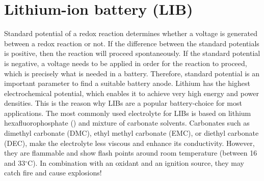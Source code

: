 \section{Lithium-ion battery (LIB)}
Standard potential of a redox reaction determines whether a voltage is generated between a redox reaction or not. If the difference between the standard potentials is positive, then the reaction will proceed spontaneously. If the standard potential is negative, a voltage needs to be applied in order for the reaction to proceed, which is precisely what is needed in a battery. Therefore, standard potential is an important parameter to find a suitable battery anode. Lithium has the highest electrochemical potential, which enables it to achieve very high energy and power densities. This is the reason why LIBs are a popular battery-choice for most applications. The most commonly used electrolyte for LIBs is based on lithium hexafluorophosphate () and mixture of carbonate solvents. Carbonates such as dimethyl carbonate (DMC), ethyl methyl carbonate (EMC), or diethyl carbonate (DEC), make the electrolyte less viscous and enhance its conductivity. However, they are flammable and show flash points around room temperature (between 16 and 33$^{\circ}$C). In combination with an oxidant and an ignition source, they may catch fire and cause explosions!\\


